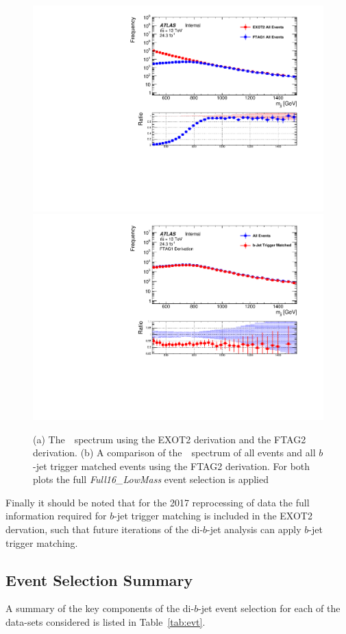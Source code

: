 \begin{figure}[!ht]
  \begin{center}
    \captionsetup[subfigure]{aboveskip=0pt,justification=centering}
    \subcaptionbox{} {\includegraphics[width=0.5\linewidth, angle=0]{figs/Dibjet/LowMass/evt-trigmatch_exot2.pdf} }\hspace{-5mm}
    \subcaptionbox{} {\includegraphics[width=0.5\linewidth, angle=0]{figs/Dibjet/LowMass/evt-trigmatch_ftag1.pdf} }
  \end{center}
  \caption{(a) The~\mjj~spectrum using the EXOT2 derivation and the FTAG2 derivation.
    (b) A comparison of the~\mjj~spectrum of all events and all $b$-jet trigger matched events using the  FTAG2 derivation.
    For both plots the full \textit{Full16\_LowMass} event selection is applied }
     \label{fig:evt-ICHEP_turnon}
\end{figure}

Finally it should be noted that for the 2017 reprocessing of data
the full information required for $b$-jet trigger matching is included in the EXOT2 dervation,
such that future iterations of the di-$b$-jet analysis can apply $b$-jet trigger matching.

\subsection{Event Selection Summary}
\label{sec:evt-sel-acc}

A summary of the  key components of the di-$b$-jet event selection
for each of the data-sets considered
is listed in Table~\ref{tab:evt}.

